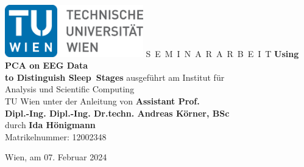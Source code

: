 \documentclass[a4paper,11pt,bibliography=totoc,listof=totoc,headinclude=true,cleardoublepage=empty,oneside]{scrbook}
\begin{document}


\begin{titlepage}
  \begin{center}
    \includegraphics[width=0.45\textwidth]{TULogo.eps}
    \vskip 1cm%
    {\LARGE S~\Large E~M~I~N~A~R~A~R~B~E~I~T}
    \vskip 8mm
    {\huge\bfseries\color{change}Using PCA on EEG Data \\[1ex] to Distinguish Sleep~Stages}
    \vskip 1cm
    \large 
    ausgef\"uhrt am    
    \vskip 0.75cm
    {\Large Institut f\"ur\\[1ex] Analysis und Scientific Computing}\\[1ex]
    {\Large TU Wien}
    \vskip0.75cm
    unter der Anleitung von
    \vskip0.75cm
    {\Large\bfseries\color{change}Assistant Prof. \\[1ex] Dipl.-Ing. Dipl.-Ing. Dr.techn. Andreas Körner, BSc}\\[1ex]
    \vskip 0.5cm
    durch
    \vskip 0.5cm
    {\Large\bfseries\color{change}Ida Hönigmann}\\[1ex]
    Matrikelnummer: {\color{change}12002348}
  \end{center}
  
  \vfill
  
  \small
  Wien, am {\color{change} 07. Februar 2024}
  \vspace*{-15mm}
\end{titlepage}

\cleardoublepage



\tableofcontents

\cleardoublepage
{} 











\listoffigures
\listoftables
\listofalgorithms


%

\end{document}
